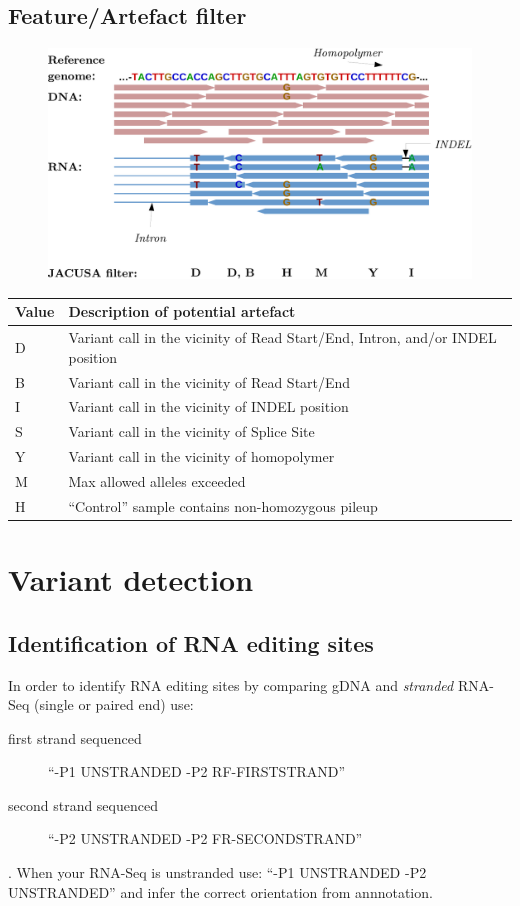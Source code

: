 \documentclass[10pt,a4paper]{article}
\begin{document}
\begin{description}
\section{Feature/Artefact filter}
\begin{figure}[h]
\centering
\includegraphics[width=\textwidth]{figures/jacusa_filter_cropped}
\end{figure}
\begin{tabular}{lp{}}
\textbf{Value} & \textbf{Description of potential artefact} \\
\hline
D & Variant call in the vicinity of Read Start/End, Intron, and/or INDEL position \\
B & Variant call in the vicinity of Read Start/End \\
I & Variant call in the vicinity of INDEL position \\
S & Variant call in the vicinity of Splice Site \\
Y & Variant call in the vicinity of homopolymer \\
M & Max allowed alleles exceeded \\ 
H & ``Control'' sample contains non-homozygous pileup \\
\end{tabular}
\end{description}
\section{Variant detection}
\subsection{Identification of RNA editing sites}
In order to identify RNA editing sites by comparing gDNA and \emph{stranded} RNA-Seq (single or paired end) use:
\begin{description} 
\item[first strand sequenced] ``-P1 UNSTRANDED -P2 RF-FIRSTSTRAND''
\item[second strand sequenced] ``-P2 UNSTRANDED -P2 FR-SECONDSTRAND''
\end{description}.
When your RNA-Seq is unstranded use: ``-P1 UNSTRANDED -P2 UNSTRANDED'' and infer the correct orientation from annnotation.
\end{document}
